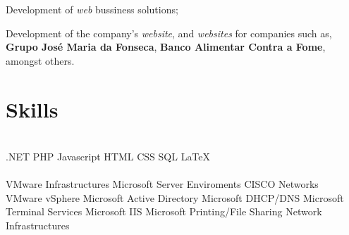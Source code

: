 \documentclass[letterpaper]{deedy-resume} %
\begin{document}
\begin{minipage}[t]{0.66\textwidth}
\sectionspace


\begin{tightitemize}
	\item Development of \textit{web} bussiness solutions;
	\item Development of the company's \textit{website}, and \textit{websites} for companies such as, \textbf{Grupo José Maria da Fonseca}, \textbf{Banco Alimentar Contra a Fome}, amongst others.
\end{tightitemize}

\sectionspace

\section{Skills}

\\
.NET \textbullet{} PHP \textbullet{} Javascript \textbullet{} HTML \textbullet{} CSS \textbullet{} SQL \textbullet{} \LaTeX{}\\
\\
VMware Infrastructures \textbullet{} Microsoft Server Enviroments \textbullet{} CISCO Networks\\
VMware vSphere \textbullet{} Microsoft Active Directory \textbullet{} Microsoft DHCP/DNS \textbullet{} Microsoft Terminal Services \textbullet{} Microsoft IIS \textbullet{} Microsoft Printing/File Sharing \textbullet{} Network Infrastructures

\end{minipage} %








\end{document}
